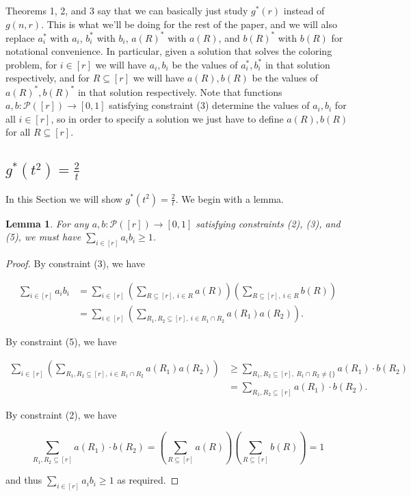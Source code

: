 \documentclass{article}
\newtheorem{lemma}{Lemma}
\begin{document}
Theorems 1, 2, and 3 say that we can basically just study $g^*(r)$ instead of $g(n,r)$. This is what we'll be doing for the rest of the paper, and we will also replace $a_i^*$ with $a_i$, $b_i^*$ with $b_i$, $a(R)^*$ with $a(R)$, and $b(R)^*$ with $b(R)$ for notational convenience. In particular, given a solution that solves the coloring problem, for $i \in [r]$ we will have $a_i,b_i$ be the values of $a_i^*,b_i^*$ in that solution respectively, and for $R \subseteq [r]$ we will have $a(R), b(R)$ be the values of $a(R)^*, b(R)^*$ in that solution respectively. Note that functions $a,b : \mathcal{P}([r]) \rightarrow [0,1]$ satisfying constraint (3) determine the values of $a_i,b_i$ for all $i \in [r]$, so in order to specify a solution we just have to define $a(R),b(R)$ for all $R \subseteq [r]$. \\

\begin{center}
\section{$g^*(t^2) = \frac{2}{t}$}
\end{center}

In this Section we will show $g^*(t^2) = \frac{2}{t}$. We begin with a lemma. \\

\begin{lemma}
For any $a,b : \mathcal{P}([r]) \rightarrow [0,1]$ satisfying constraints (2), (3), and (5), we must have $\sum_{i \in [r]} a_ib_i \geq 1$.
\end{lemma}

\begin{proof}

\noindent
By constraint (3), we have

\begin{align*}
\sum_{i \in [r]} a_ib_i &= \sum_{i \in [r]} \left( \sum_{R \subseteq [r], \ i \in R} a(R) \right) \left( \sum_{R \subseteq [r], \ i \in R} b(R) \right) \\
&= \sum_{i \in [r]} \left( \sum_{R_1, R_2 \subseteq [r], \ i \in R_1 \cap R_2} a(R_1)a(R_2) \right).
\end{align*}

\noindent
By constraint (5), we have

\begin{align*}
\sum_{i \in [r]} \left( \sum_{R_1, R_2 \subseteq [r], \ i \in R_1 \cap R_2} a(R_1)a(R_2) \right) &\geq  \sum_{R_1, R_2 \subseteq [r] , \ R_1 \cap R_2 \neq \{\}} a(R_1) \cdot b(R_2) \\
&= \sum_{R_1, R_2 \subseteq [r]} a(R_1) \cdot b(R_2).
\end{align*}

\noindent
By constraint (2), we have

$$\sum_{R_1, R_2 \subseteq [r]} a(R_1) \cdot b(R_2) = \left( \sum_{R \subseteq [r]} a(R) \right) \left( \sum_{R \subseteq [r]} b(R) \right)  = 1$$

\noindent
and thus $\sum_{i \in [r]} a_ib_i \geq 1$ as required.
\end{proof}
\end{document}
